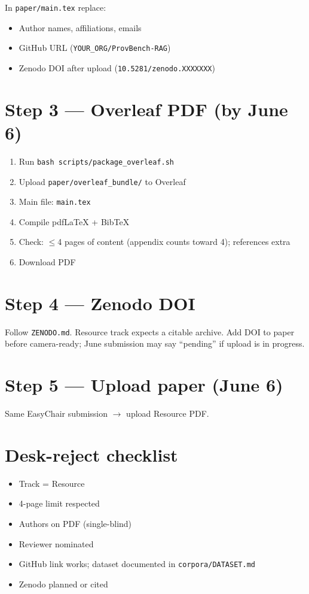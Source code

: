 \documentclass[11pt]{article}
\begin{document}
In \texttt{paper/main.tex} replace:
\begin{itemize}
\item Author names, affiliations, emails
\item GitHub URL (\texttt{YOUR\_ORG/ProvBench-RAG})
\item Zenodo DOI after upload (\texttt{10.5281/zenodo.XXXXXXX})
\end{itemize}

\section{Step 3 --- Overleaf PDF (by June 6)}

\begin{enumerate}
\item Run \texttt{bash scripts/package\_overleaf.sh}
\item Upload \texttt{paper/overleaf\_bundle/} to Overleaf
\item Main file: \texttt{main.tex}
\item Compile pdfLaTeX + BibTeX
\item Check: $\leq$4 pages of content (appendix counts toward 4); references extra
\item Download PDF
\end{enumerate}

\section{Step 4 --- Zenodo DOI}

Follow \texttt{ZENODO.md}. Resource track expects a citable archive. Add DOI to paper before camera-ready; June submission may say ``pending'' if upload is in progress.

\section{Step 5 --- Upload paper (June 6)}

Same EasyChair submission $\rightarrow$ upload Resource PDF.

\section{Desk-reject checklist}

\begin{itemize}
\item Track = Resource
\item 4-page limit respected
\item Authors on PDF (single-blind)
\item Reviewer nominated
\item GitHub link works; dataset documented in \texttt{corpora/DATASET.md}
\item Zenodo planned or cited
\end{itemize}
\end{document}
